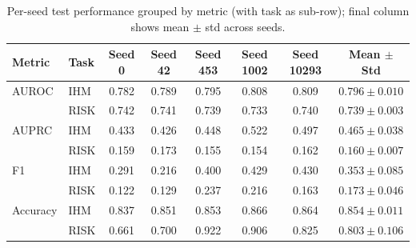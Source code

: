 \begin{table}[h]
\centering
\small
\begin{tabular}{ll|ccccc|c}
\hline
Metric & Task & Seed 0 & Seed 42 & Seed 453 & Seed 1002 & Seed 10293 & Mean $\pm$ Std \\
\hline
AUROC & IHM & 0.782 & 0.789 & 0.795 & 0.808 & 0.809 & $0.796 \pm 0.010$ \\
 & RISK & 0.742 & 0.741 & 0.739 & 0.733 & 0.740 & $0.739 \pm 0.003$ \\
\hline
AUPRC & IHM & 0.433 & 0.426 & 0.448 & 0.522 & 0.497 & $0.465 \pm 0.038$ \\
 & RISK & 0.159 & 0.173 & 0.155 & 0.154 & 0.162 & $0.160 \pm 0.007$ \\
\hline
F1 & IHM & 0.291 & 0.216 & 0.400 & 0.429 & 0.430 & $0.353 \pm 0.085$ \\
 & RISK & 0.122 & 0.129 & 0.237 & 0.216 & 0.163 & $0.173 \pm 0.046$ \\
\hline
Accuracy & IHM & 0.837 & 0.851 & 0.853 & 0.866 & 0.864 & $0.854 \pm 0.011$ \\
 & RISK & 0.661 & 0.700 & 0.922 & 0.906 & 0.825 & $0.803 \pm 0.106$ \\
\hline
\end{tabular}
\caption{Per-seed test performance grouped by metric (with task as sub-row); final column shows mean $\pm$ std across seeds.}
\end{table}
